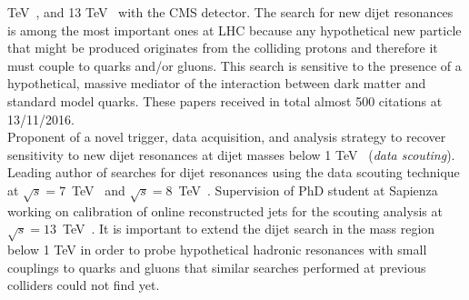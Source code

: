 \documentclass[10pt, a4paper]{article}
\newcommand{\years}[1]{\marginnote{\hskip-0.2in{\scriptsize #1}}}
\begin{document}
TeV~\cite{Chatrchyan:2013qha,AN-12-229,Khachatryan:2015sja,AN-12-455},
and 13 TeV~\cite{Sirunyan:2016iap,AN-16-202,Khachatryan:2015dcf,AN-15-063,AN-15-175} with the CMS
detector. The search for new dijet resonances is among the most
important ones at LHC because any hypothetical new
particle that might be produced originates from the colliding protons
and therefore it must couple to quarks and/or gluons. This search is
sensitive to the presence of a hypothetical, massive  mediator of the interaction between dark matter and
standard model quarks. These papers received in total almost 500 citations at 13/11/2016.\\ [1em] 
\years{09/2011 - today}
Proponent of a novel trigger, data acquisition, and analysis
strategy to recover sensitivity to new dijet resonances at dijet
masses below 1 TeV~\cite{CMS-DP-2012-022} ({\it data scouting}).
Leading author of searches for dijet resonances using the data
scouting technique at $\sqrt{s}=7$~TeV~\cite{CMS-PAS-EXO-11-094} 
and $\sqrt{s}=8$~TeV~\cite{Khachatryan:2016ecr,AN-14-104}. Supervision
of PhD student at Sapienza working on calibration of online
reconstructed jets for the scouting analysis
at~$\sqrt{s}=13$~TeV~\cite{Sirunyan:2016iap,AN-16-202}. 
It is important to extend the dijet search in the mass region below 1 TeV 
in order to probe hypothetical hadronic resonances with small
couplings to quarks and gluons that similar searches performed at
previous colliders could not find yet. \\ [1em] 
\end{document}

